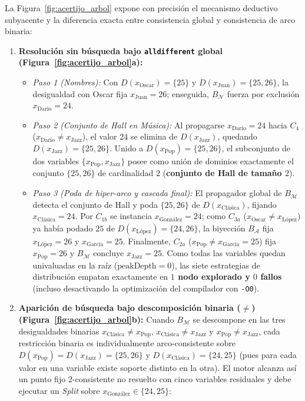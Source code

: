 La Figura~\ref{fig:acertijo_arbol} expone con precisión el mecanismo deductivo subyacente y la diferencia exacta entre consistencia global y consistencia de arco binaria:
\begin{enumerate}
    \item \textbf{Resolución sin búsqueda bajo \texttt{alldifferent} global (Figura~\ref{fig:acertijo_arbol}a):}
    \begin{itemize}
        \item \emph{Paso 1 (Nombres):} Con $D(x_{\text{Oscar}}) = \{25\}$ y $D(x_{\text{Juan}}) = \{25, 26\}$, la desigualdad con Oscar fija $x_{\text{Juan}} = 26$; enseguida, $B_{\mathcal{N}}$ fuerza por exclusión $x_{\text{Darío}} = 24$.
        \item \emph{Paso 2 (Conjunto de Hall en Música):} Al propagarse $x_{\text{Darío}} = 24$ hacia $C_4$ ($x_{\text{Darío}} \neq x_{\text{Jazz}}$), el valor $24$ se elimina de $D(x_{\text{Jazz}})$, quedando $D(x_{\text{Jazz}}) = \{25, 26\}$. Unido a $D(x_{\text{Pop}}) = \{25, 26\}$, el subconjunto de dos variables $\{x_{\text{Pop}}, x_{\text{Jazz}}\}$ posee como unión de dominios exactamente el conjunto $\{25, 26\}$ de cardinalidad $2$ (\textbf{conjunto de Hall de tamaño $2$}).
        \item \emph{Paso 3 (Poda de hiper-arco y cascada final):} El propagador global de $B_{\mathcal{M}}$ detecta el conjunto de Hall y poda $\{25, 26\}$ de $D(x_{\text{Clásica}})$, fijando $x_{\text{Clásica}} = 24$. Por $C_{1b}$ se instancia $x_{\text{González}} = 24$; como $C_{3a}$ ($x_{\text{Oscar}} \neq x_{\text{López}}$) ya había podado $25$ de $D(x_{\text{López}}) = \{24, 26\}$, la biyección $B_{\mathcal{A}}$ fija $x_{\text{López}} = 26$ y $x_{\text{García}} = 25$. Finalmente, $C_{2a}$ ($x_{\text{Pop}} \neq x_{\text{García}} = 25$) fija $x_{\text{Pop}} = 26$ y $B_{\mathcal{M}}$ concluye $x_{\text{Jazz}} = 25$. Como todas las variables quedan univaluadas en la raíz ($\text{peakDepth} = 0$), las siete estrategias de distribución empatan exactamente en \textbf{$1$ nodo explorado y $0$ fallos} (incluso desactivando la optimización del compilador con \texttt{-O0}).
    \end{itemize}
    \item \textbf{Aparición de búsqueda bajo descomposición binaria ($\neq$) (Figura~\ref{fig:acertijo_arbol}b):}
    Cuando $B_{\mathcal{M}}$ se descompone en las tres desigualdades binarias $x_{\text{Clásica}} \neq x_{\text{Pop}}$, $x_{\text{Clásica}} \neq x_{\text{Jazz}}$ y $x_{\text{Pop}} \neq x_{\text{Jazz}}$, cada restricción binaria es individualmente arco-consistente sobre $D(x_{\text{Pop}}) = D(x_{\text{Jazz}}) = \{25, 26\}$ y $D(x_{\text{Clásica}}) = \{24, 25\}$ (pues para cada valor en una variable existe soporte distinto en la otra). El motor alcanza así un punto fijo $2$-consistente no resuelto con cinco variables residuales y debe ejecutar un \emph{Split} sobre $x_{\text{González}} \in \{24, 25\}$:

\end{enumerate}
